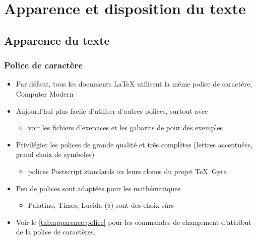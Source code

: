 \chapter{Apparence et disposition du texte}
\label{chap:apparence}


\section{Apparence du texte}

\subsection{Police de caractère}

\begin{itemize}
\item Par défaut, tous les documents {\LaTeX} utilisent la même police
  de caractère, {\selectfont Computer Modern}
\item Aujourd'hui plus facile d'utiliser d'autres polices, surtout
  avec {\XeLaTeX}
  \begin{itemize}
  \item voir les fichiers d'exercices et les gabarits de
     pour des exemples
  \end{itemize}
\item Privilégier les polices de grande qualité et très complètes
  (lettres accentuées, grand choix de symboles)
  \begin{itemize}
  \item polices Postscript standards ou leurs clones du projet
    TeX~Gyre
  \end{itemize}
\item Peu de polices sont adaptées pour les mathématiques
  \begin{itemize}
  \item {\selectfont Palatino},
    {\selectfont Times}, \textrm{Lucida} (\$) sont des
    choix sûrs
  \end{itemize}
\item Voir le \autoref{tab:apparence:police} pour les commandes de
  changement d'attribut de la police de caractères.
\end{itemize}

